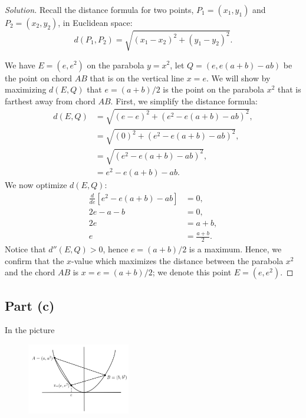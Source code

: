 \documentclass[letterpaper, 12pt]{amsart}
\theoremstyle{definition}  %
\begin{document}
		\begin{proof}[Solution]
		Recall the distance formula for two points, $P_{1} = (x_{1}, y_{1})$ and $P_{2} = (x_{2}, y_{2})$, in Euclidean space: $$d(P_{1},P_{2}) = \sqrt{(x_{1} - x_{2})^{2} + (y_{1} - y_{2})^{2}}.$$

		We have $E = (e, e^{2})$ on the parabola $y = x^{2}$, let $Q = (e, e(a + b) - ab)$ be the point on chord $AB$ that is on the vertical line $x = e$.
		We will show by maximizing $d(E,Q)$ that $e = (a+b)/2$ is the point on the parabola $x^{2}$ that is farthest away from chord $AB$.
		First, we simplify the distance formula:
			\begin{align*}
				d(E,Q) &= \sqrt{(e - e)^{2} + \left( e^{2} - e(a + b) - ab \right)^{2}}, \\
				&= \sqrt{(0)^{2} + \left( e^{2} - e(a + b) - ab \right)^{2}}, \\
				&= \sqrt{\left( e^{2} - e(a + b) - ab \right)^{2}}, \\
				&= e^{2} - e(a + b) - ab.
			\end{align*}
		We now optimize $d(E,Q)$:
			\begin{align*}
				\frac{d}{de}\left[ e^{2} - e(a + b) - ab \right] &= 0, \\
				2e - a - b &= 0, \\
				2e &= a + b, \\
				e &= \frac{a + b}{2}.
			\end{align*}
		Notice that $d''(E,Q) > 0$, hence $e = (a + b)/2$ is a maximum. 
		Hence, we confirm that the $x$-value which maximizes the distance between the parabola $x^{2}$ and the chord $AB$ is $x = e = (a + b)/2$; we denote this point $E = (e, e^{2})$.
		\end{proof}

		\subsection*{Part (c)}
		In the picture 
		\begin{figure}[h]
		\includegraphics[width=0.4\textwidth]{figures/2.png}
		\end{figure}
\end{document}

